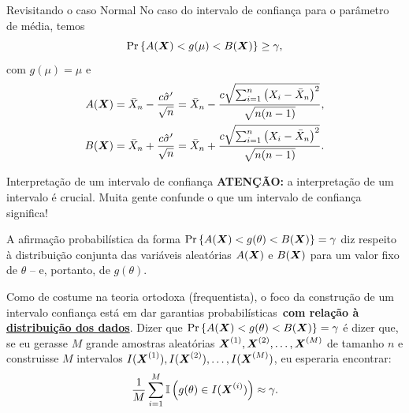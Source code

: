 \begin{frame}{Revisitando o caso Normal}
No caso do intervalo de confiança para o parâmetro de média, temos 
$$\operatorname{Pr}\left\{A(\boldsymbol{X}) < g(\mu) <  B(\boldsymbol{X})\right\} \geq \gamma,$$
com $g(\mu) = \mu$  e 
\begin{align*}
 A(\boldsymbol{X}) &= \bar{X}_n - \frac{c\hat{\sigma}^\prime}{\sqrt{n}} = \bar{X}_n - \frac{c\sqrt{\sum_{i=1}^n \left(X_i - \bar{X}_n\right)^2}}{\sqrt{n(n-1)}},\\
 B(\boldsymbol{X}) &= \bar{X}_n + \frac{c\hat{\sigma}^\prime}{\sqrt{n}} = \bar{X}_n + \frac{c\sqrt{\sum_{i=1}^n \left(X_i - \bar{X}_n\right)^2}}{\sqrt{n(n-1)}}.
\end{align*}
\end{frame}

\begin{frame}{Interpretação de um intervalo de confiança}
 \textbf{ATENÇÃO:} a interpretação de um intervalo é crucial.
 Muita gente confunde o que um intervalo de confiança significa!
 \begin{obs}
  A afirmação probabilística da forma $\operatorname{Pr}\left\{A(\boldsymbol{X}) < g(\theta) <  B(\boldsymbol{X})\right\} = \gamma$ diz respeito à distribuição conjunta das variáveis aleatórias  $A(\boldsymbol{X})$ e $B(\boldsymbol{X})$ para um valor fixo de $\theta$ -- e, portanto, de $g(\theta)$.
 \end{obs}
 
 \begin{ideia} 
 Como de costume na teoria ortodoxa (frequentista), o foco da construção de um intervalo confiança está em dar garantias probabilísticas~\textbf{com relação à \underline{distribuição dos dados}}.
 Dizer que $\operatorname{Pr}\left\{A(\boldsymbol{X}) < g(\theta) <  B(\boldsymbol{X})\right\} = \gamma$ é dizer que, se eu gerasse $M$ grande amostras aleatórias $\boldsymbol{X}^{(1)}, \boldsymbol{X}^{(2)}, \ldots, \boldsymbol{X}^{(M)}$ de tamanho $n$ e construisse $M$ intervalos $I(\boldsymbol{X}^{(1)}), I(\boldsymbol{X}^{(2)}), \ldots, I(\boldsymbol{X}^{(M)})$, eu esperaria encontrar:
 \begin{equation*}
  \frac{1}{M}\sum_{i=1}^M \mathbb{I}\left(g(\theta) \in I(\boldsymbol{X}^{(i)}) \right) \approx \gamma.
 \end{equation*}
\end{ideia}
\end{frame}

